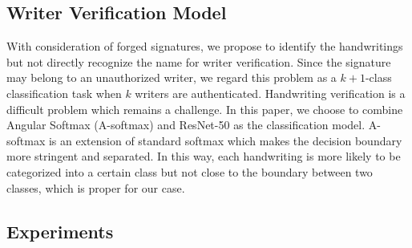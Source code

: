 \documentclass[sigconf]{acmart}
\begin{document}
\subsection{Writer Verification Model}
With consideration of forged signatures, we propose to identify the handwritings but not directly recognize the name for writer verification. Since the signature may belong to an unauthorized writer, we regard this problem as a $k+1$-class classification task when $k$ writers are authenticated. Handwriting verification is a difficult problem which remains a challenge. In this paper, we choose to combine Angular Softmax (A-softmax) \cite{liu2017sphereface} and ResNet-50 \cite{he2016deep} as the classification model. A-softmax is an extension of standard softmax which makes the decision boundary more stringent and separated. In this way, each handwriting is more likely to be categorized into a certain class but not close to the boundary between two classes, which is proper for our case. 

\subsection{Experiments}
\end{document}
